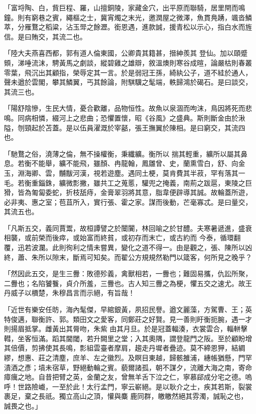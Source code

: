 \begin{pinyinscope}
 「富埒陶、白，貲巨程、羅，山擅銅陵，家藏金穴，出平原而聯騎，居里閈而鳴鐘。則有窮巷之賓，繩樞之士，冀宵燭之末光，邀潤屋之微澤，魚貫鳧踴，颯沓鱗萃，分雁鶩之稻粱，沾玉斝之餘瀝。銜恩遇，進款誠，援青松以示心，指白水而旌信。是曰賄交，其流二也。



 「陸大夫燕喜西都，郭有道人倫東國，公卿貴其籍甚，搢紳羨其
 登仙。加以頤蹙頞，涕唾流沫，騁黃馬之劇談，縱碧雞之雄辯，敘溫燠則寒谷成暄，論嚴枯則春叢零葉，飛沉出其顧指，榮辱定其一言。於是弱冠王孫，綺紈公子，道不絓於通人，聲未遒於雲閣，攀其鱗翼，丐其餘論，附騏驥之髦端，軼歸鴻於碣石。是曰談交，其流三也。



 「陽舒陰慘，生民大情，憂合歡離，品物恒性。故魚以泉涸而呴沫，鳥因將死而悲鳴。同病相憐，綴河上之悲曲；恐懼置懷，昭《谷風》之盛典。斯則斷金由於湫隘，刎頸起於苫蓋。是以伍員濯溉於宰嚭，張王撫翼於陳相。是曰窮交，其流四也。



 「馳鶩之俗，澆薄之倫，無不操權衡，秉纖纊。衡所以
 揣其輕重，纊所以屬其鼻息。若衡不能舉，纊不能飛，雖顏、冉龍翰，鳳雛曾、史，蘭熏雪白，舒、向金玉，淵海卿、雲，黼黻河漢，視若遊塵。遇同土梗，莫肯費其半菽，罕有落其一毛。若衡重錙銖，纊微彯撇，雖共工之蒐慝，驩兜之掩義，南荊之跋扈，東陵之巨猾，皆為匍匐委蛇，折枝舐痔，金膏翠羽將其意，脂韋便辟導其誠。故輪蓋所遊，必非夷、惠之室；苞苴所入，實行張、霍之家。謀而後動，芒毫寡忒。是曰量交，其流五也。



 「凡斯五交，義同賈鬻，故桓譚譬之於闤闠，林回喻之於甘醴。夫寒暑遞進，盛衰相襲，或前榮而後瘁，或始富而終貧，或初存而末亡，或古約而
 今泰，循環翻覆，迅若波瀾。此則徇利之情未嘗異，變化之道不得一。由是觀之，張、陳所以凶終，蕭、朱所以隙末，斷焉可知矣。而翟公方規規然勒門以箴客，何所見之晚乎？



 「然因此五交，是生三釁：敗德殄義，禽獸相若，一釁也；難固易攜，仇訟所聚，二釁也；名陷饕餮，貞介所羞，三釁也。古人知三釁之為梗，懼五交之速尤。故王丹威子以檟楚，朱穆昌言而示絕，有旨哉！



 「近世有樂安任昉，海內髦傑，早綰銀黃，夙招民譽。遒文麗藻，方駕曹、王；英特俊邁，聯衡許、郭。類田文之愛客，同鄭莊之好賢。見一善則盱衡扼腕，遇一才則揚眉抵掌。雌黃出其脣吻，朱紫
 由其月旦。於是冠蓋輻湊，衣裳雲合，輜軿擊轊，坐客恒滿。蹈其閫閾，若升闕里之堂；入其奧隅，謂登龍門之阪。至於顧盼增其倍價，剪拂使其長鳴，彯組雲臺者摩肩，趨走丹墀者疊迹。莫不締恩狎，結綢繆，想惠、莊之清塵，庶羊、左之徽烈。及瞑目東越，歸骸雒浦，繐帳猶懸，門罕漬酒之彥；墳未宿草，野絕動輪之賓。藐爾諸孤，朝不謀夕，流離大海之南，寄命瘴癘之地。自昔把臂之英，金蘭之友，曾無羊舌下泣之仁，寧慕郈成分宅之德。嗚呼！世路險巇，一至於此！太行孟門，寧云嶄絕。是以耿介之士，疾其若斯，裂裳裹足，棄之長祇。獨立高山之頂，懽與麋
 鹿同群，皦皦然絕其雰濁，誠恥之也，誠畏之也。」




\end{pinyinscope}
